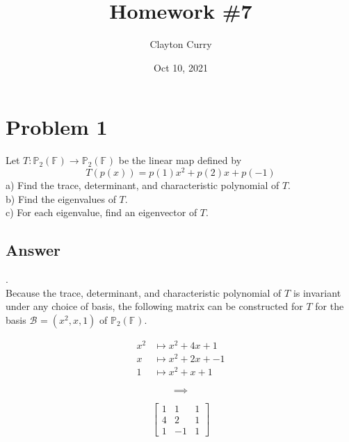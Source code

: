 \documentclass[
	12pt, %
]{fphw}
\title{Homework \#7} %
\author{Clayton Curry} %
\date{Oct 10, 2021} %
\institute{University of Oklahoma \\ Department of Mathematics} %
\newcommand\0{\mathbf{0}}
\newcommand\F[1]{\text{$\mathbb{F}^{#1}$}}
\newcommand\B[1]{\text{$\mathcal{B}_{#1}$}}
\newcommand\poly[1]{\text{$\mathbb{P}_{#1}(\F{})$}}
\begin{document}
\maketitle %


\section*{Problem 1}
\begin{problem}
Let $T: \poly{2} \to \poly{2}$ be the linear map defined by
\begin{equation*}
T(p(x))=p(1)x^2+p(2)x+p(-1)
\end{equation*}
\noindent
a) Find the trace, determinant, and characteristic polynomial of $T$.\\
b) Find the eigenvalues of $T$.\\
c) For each eigenvalue, find an eigenvector of $T$.
\end{problem}

\subsection*{Answer} .\\
\noindent
Because the trace, determinant, and characteristic polynomial of $T$ is invariant under any choice of basis, the following matrix can be constructed for $T$ for the basis $\B{}=(x^2, x, 1)$ of $\poly{2}$.

\begin{minipage}{0.30\textwidth}
\begin{align*}
x^2 &\mapsto x^2 + 4 x + 1\\
x &\mapsto x^2 + 2 x + -1 \\
1 &\mapsto x^2 + x + 1
\end{align*}
\end{minipage}%
\begin{minipage}{0.30\textwidth}
$$
\implies
$$
\end{minipage}
\begin{minipage}{0.30\textwidth}
$$
\begin{bmatrix}
1 & 1 & 1\\
4 & 2 & 1\\
1 & -1 & 1
\end{bmatrix}
$$
\end{minipage}%
\end{document}
